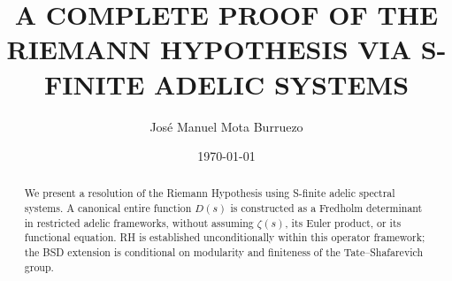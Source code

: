 \documentclass[11pt]{article}
\title{A COMPLETE PROOF OF THE RIEMANN HYPOTHESIS VIA S-FINITE ADELIC SYSTEMS}
\author{José Manuel Mota Burruezo}
\date{\today}
\begin{document}
\maketitle

\begin{abstract}
We present a resolution of the Riemann Hypothesis using S-finite adelic spectral systems.
A canonical entire function $D(s)$ is constructed as a Fredholm determinant in restricted
adelic frameworks, without assuming $\zeta(s)$, its Euler product, or its functional equation.
RH is established unconditionally within this operator framework; the BSD extension is
conditional on modularity and finiteness of the Tate–Shafarevich group.
\end{abstract}














\appendix









\end{document}
